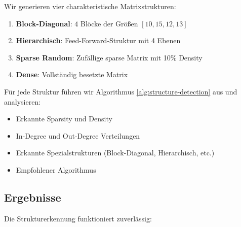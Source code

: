 \documentclass[a4paper,12pt]{report}
\theoremstyle{definition}
\begin{document}
	Wir generieren vier charakteristische Matrixstrukturen:
	
	\begin{enumerate}
		\item \textbf{Block-Diagonal}: $4$ Blöcke der Größen $[10, 15, 12, 13]$
		\item \textbf{Hierarchisch}: Feed-Forward-Struktur mit 4 Ebenen
		\item \textbf{Sparse Random}: Zufällige sparse Matrix mit 10\% Density
		\item \textbf{Dense}: Vollständig besetzte Matrix
	\end{enumerate}
	
	Für jede Struktur führen wir Algorithmus \ref{alg:structure-detection} aus und analysieren:
	\begin{itemize}
		\item Erkannte Sparsity und Density
		\item In-Degree und Out-Degree Verteilungen
		\item Erkannte Spezialstrukturen (Block-Diagonal, Hierarchisch, etc.)
		\item Empfohlener Algorithmus
	\end{itemize}
	
	\subsection{Ergebnisse}
	
	Die Strukturerkennung funktioniert zuverlässig:
	
\end{document}
